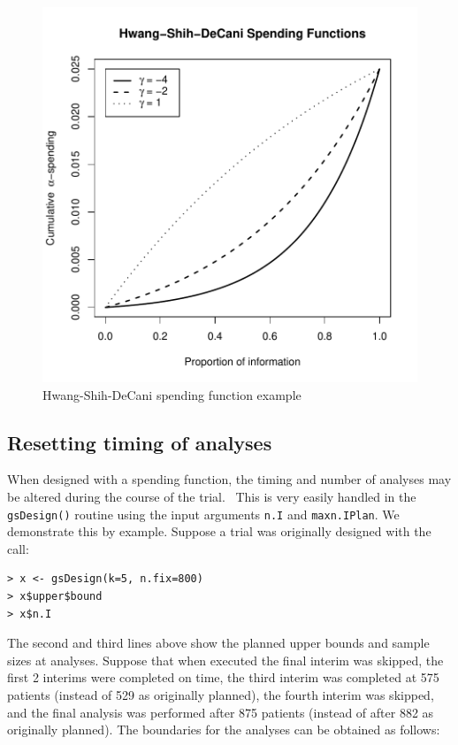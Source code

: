 \bigskip 

\begin{center}%
\begin{figure}
\begin{center}
\includegraphics[width=.6\textwidth]{figs/HSDexample.pdf}
\end{center}
\caption{Hwang-Shih-DeCani spending function example\label{fig:hsd}}
\end{figure}%

\end{center}

\subsection{Resetting timing of analyses\label{sec:reset}}

When designed with a spending function, the timing and number of analyses may
be altered during the course of the trial. \ This is very easily handled in
the \texttt{gsDesign()} routine using the input arguments \texttt{n.I} and
\texttt{maxn.IPlan}. We demonstrate this by example. Suppose a trial was
originally designed with the call:

\bigskip

\begin{verbatim}
> x <- gsDesign(k=5, n.fix=800)
> x$upper$bound
> x$n.I
\end{verbatim}

\bigskip

The second and third lines above show the planned upper bounds and sample
sizes at analyses. Suppose that when executed the final interim was skipped,
the first 2 interims were completed on time, the third interim was completed
at 575 patients (instead of 529 as originally planned), the fourth interim was
skipped, and the final analysis was performed after 875 patients (instead of
after 882 as originally planned). The boundaries for the analyses can be
obtained as follows:


